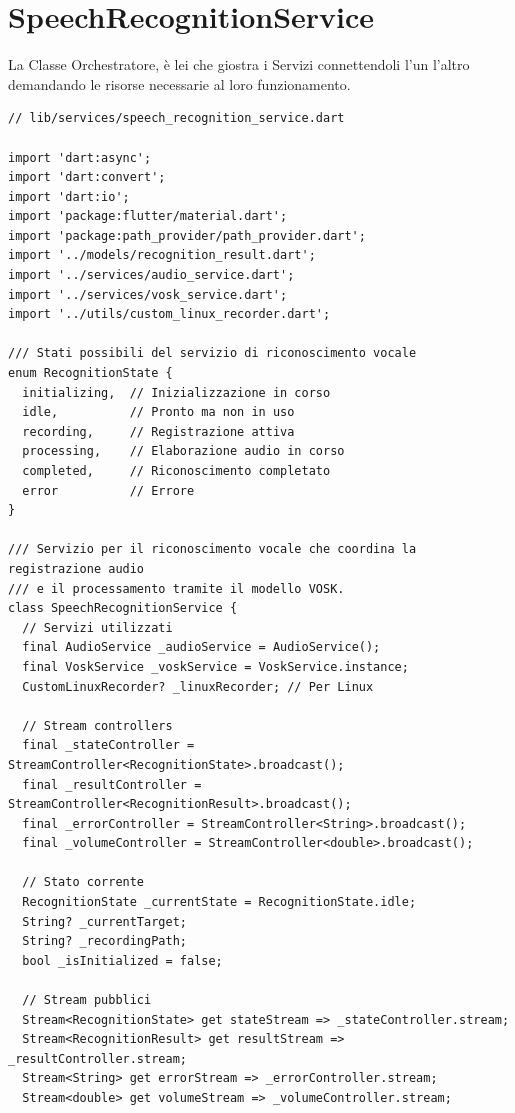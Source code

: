 \documentclass[14pt]{extbook}
\begin{document}
\section{SpeechRecognitionService}
La Classe Orchestratore, è lei che giostra i Servizi connettendoli l'un l'altro demandando le risorse necessarie al loro funzionamento.\\
\begin{lstlisting}[caption=speech\_recognition\_service.dart, label=lst:SpeechRecognitionService]
// lib/services/speech_recognition_service.dart

import 'dart:async';
import 'dart:convert';
import 'dart:io';
import 'package:flutter/material.dart';
import 'package:path_provider/path_provider.dart';
import '../models/recognition_result.dart';
import '../services/audio_service.dart';
import '../services/vosk_service.dart';
import '../utils/custom_linux_recorder.dart';

/// Stati possibili del servizio di riconoscimento vocale
enum RecognitionState {
  initializing,  // Inizializzazione in corso
  idle,          // Pronto ma non in uso
  recording,     // Registrazione attiva
  processing,    // Elaborazione audio in corso
  completed,     // Riconoscimento completato
  error          // Errore
}

/// Servizio per il riconoscimento vocale che coordina la registrazione audio
/// e il processamento tramite il modello VOSK.
class SpeechRecognitionService {
  // Servizi utilizzati
  final AudioService _audioService = AudioService();
  final VoskService _voskService = VoskService.instance;
  CustomLinuxRecorder? _linuxRecorder; // Per Linux

  // Stream controllers
  final _stateController = StreamController<RecognitionState>.broadcast();
  final _resultController = StreamController<RecognitionResult>.broadcast();
  final _errorController = StreamController<String>.broadcast();
  final _volumeController = StreamController<double>.broadcast();

  // Stato corrente
  RecognitionState _currentState = RecognitionState.idle;
  String? _currentTarget;
  String? _recordingPath;
  bool _isInitialized = false;

  // Stream pubblici
  Stream<RecognitionState> get stateStream => _stateController.stream;
  Stream<RecognitionResult> get resultStream => _resultController.stream;
  Stream<String> get errorStream => _errorController.stream;
  Stream<double> get volumeStream => _volumeController.stream;


\end{lstlisting}
\end{document}
